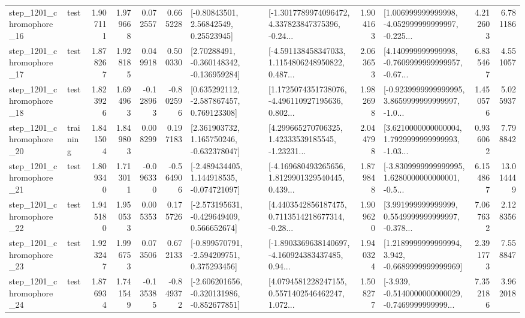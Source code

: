 \begin{tabular}{llrrrrllrlrr}
 step\_1201\_chromophore\_16 &      test &      1.907111 &    1.979668 &      0.072557 &  0.665228 &       [-0.80843501, 2.56842549, 0.25523945] &  [-1.3017789974096472, 4.337823847375396, -0.24... &       1.904163 &  [1.006999999999998, -4.052999999999997, -0.225... &            4.212603 &          6.781186 \\
 step\_1201\_chromophore\_17 &      test &      1.878267 &    1.928185 &      0.049918 &  0.500330 &    [2.70288491, -0.360148342, -0.136959284] &  [-4.591138458347033, 1.1154806248950822, 0.487... &       2.063653 &  [4.140999999999998, -0.7609999999999957, -0.67... &            6.835467 &          4.551057 \\
 step\_1201\_chromophore\_18 &      test &      1.823926 &    1.694963 &     -0.128963 & -0.802596 &    [0.635292112, -2.587867457, 0.769123308] &  [1.1725074351738076, -4.496110927195636, 0.802... &       1.982698 &  [-0.9239999999999995, 3.8659999999999997, -1.0... &            1.450576 &          5.025937 \\
 step\_1201\_chromophore\_20 &  training &      1.841504 &    1.849803 &      0.008299 &  0.197183 &    [2.361903732, 1.165750246, -0.632378047] &  [4.299665270706325, 1.42333539185545, -1.23231... &       2.044798 &  [3.6210000000000004, 1.7929999999999993, -1.03... &            0.936062 &          7.798842 \\
 step\_1201\_chromophore\_21 &      test &      1.809340 &    1.713011 &     -0.096330 & -0.564906 &   [-2.489434405, 1.144918535, -0.074721097] &  [-4.169680493265656, 1.8129901329540445, 0.439... &       1.879848 &  [-3.8309999999999995, 1.6280000000000001, -0.5... &            6.154867 &         13.014449 \\
 step\_1201\_chromophore\_22 &      test &      1.945180 &    1.950533 &      0.005353 &  0.175726 &   [-2.573195631, -0.429649409, 0.566652674] &  [4.4403542856187475, 0.7113514218677314, -0.28... &       1.909620 &  [3.991999999999999, 0.5549999999999997, -0.378... &            7.067632 &          2.128356 \\
 step\_1201\_chromophore\_23 &      test &      1.923247 &    1.996753 &      0.073506 &  0.672133 &   [-0.899570791, -2.594209751, 0.375293456] &  [-1.8903369638140697, -4.160924383437485, 0.94... &       1.940324 &   [1.2189999999999994, 3.942, -0.6689999999999969] &            2.391773 &          7.558847 \\
 step\_1201\_chromophore\_24 &      test &      1.876934 &    1.741549 &     -0.135385 & -0.849372 &  [-2.606201656, -0.320131986, -0.852677851] &  [4.0794581228247155, 0.5571402546462247, 1.072... &       1.508277 &  [-3.939, -0.5140000000000029, -0.7469999999999... &            7.352186 &          3.962018 \\

\end{tabular}
